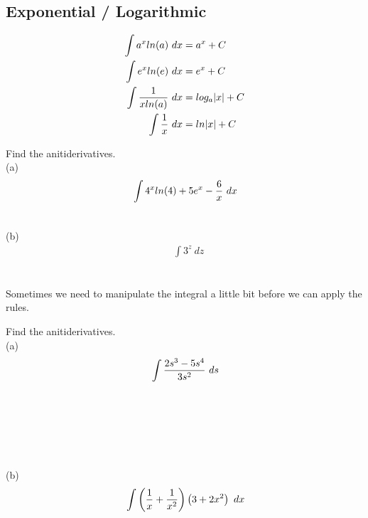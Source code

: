 \subsection{Exponential / Logarithmic}

\begin{theorem}
    \begin{align}
        \int a^xln(a) \ dx         & = a^x + C      \\
        \int e^xln(e) \ dx         & = e^x + C      \\
        \int {1 \over xln(a)} \ dx & = log_a|x| + C \\
        \int {1 \over x} \ dx      & = ln|x| + C
    \end{align}
\end{theorem}

\begin{exercise}\nonumber
    Find the anitiderivatives. \\

    (a)
    \begin{align}
         & \int 4^xln(4) + 5e^x - {6 \over x} \ dx \\
        \\
    \end{align}

    (b)
    \begin{align}
         & \int 3^z \ dz \\
        \\
        \\
        \\
    \end{align}
\end{exercise}

Sometimes we need to manipulate the integral a little bit before we can apply the rules. \\

\begin{exercise}\nonumber
    Find the anitiderivatives. \\

    (a)
    \begin{align}
         & \int {2s^3 - 5s^4 \over 3s^2} \ ds \\
        \\
        \\
        \\
        \\
        \\
    \end{align}

    (b)
    \begin{align}
         & \int \left({1 \over x} + {1 \over x^2}\right)\left(3 + 2x^2\right) \ dx \\
        \\
        \\
        \\
        \\
        \\
    \end{align}
\end{exercise}

